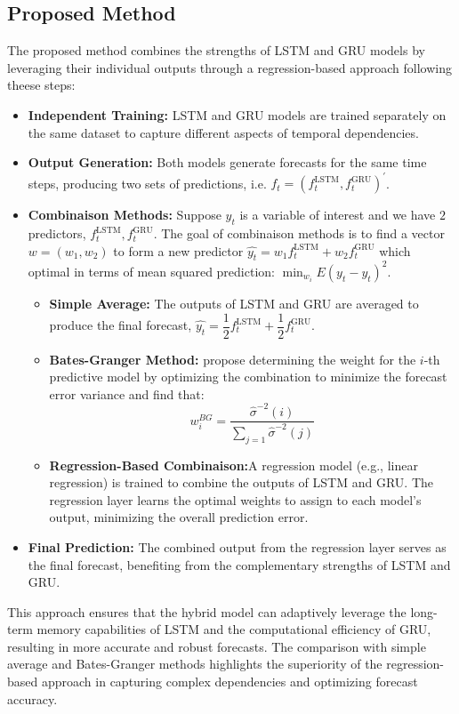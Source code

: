 \documentclass{dsfe}
\begin{document}
\subsection{Proposed Method}
The proposed method combines the strengths of LSTM and GRU models by leveraging their individual outputs through a regression-based approach following theese steps:
\begin{itemize}
\item[]\textbf{Independent Training:} LSTM and GRU models are trained separately on the same dataset to capture different aspects of temporal dependencies.
\item[]\textbf{Output Generation:} Both models generate forecasts for the same time steps, producing two sets of predictions, i.e. $f_t=(f_t^{\text{LSTM}}, f_t^{\text{GRU}})^{'}$.
\item[]\textbf{Combinaison Methods:} Suppose $y_t$ is a variable of interest and we have $2$ predictors, $f_t^{\text{LSTM}}, f_t^{\text{GRU}}$. The goal of combinaison methods is to find a vector $w=(w_1,w_2)$ to form a new predictor $\widehat{y_t}=w_1 f_t^{\text{LSTM}} + w_2 f_t^{\text{GRU}}$ which optimal in terms of mean squared prediction: $\min_{w_i}E(y_t-\widehat{y_t})^2$.
\begin{itemize}
 \item \textbf{Simple Average:} The outputs of LSTM and GRU are averaged to produce the final forecast, $\widehat{y_t}=\dfrac{1}{2} f_t^{\text{LSTM}} + \dfrac{1}{2} f_t^{\text{GRU}}$.
\item \textbf{Bates-Granger Method:} \citep{bates1969} propose determining the weight for the $i$-th predictive model by optimizing the combination to minimize the forecast error variance and find that: 
$$
w_i^{BG}=\dfrac{\widehat{\sigma}^{-2}(i)}{\displaystyle{\sum_{j=1}}\widehat{\sigma}^{-2}(j)}
$$
\item \textbf{Regression-Based Combinaison:}A regression model (e.g., linear regression) is trained to combine the outputs of LSTM and GRU. The regression layer learns the optimal weights to assign to each model's output, minimizing the overall prediction error.
\end{itemize}
\item[]\textbf{Final Prediction:} The combined output from the regression layer serves as the final forecast, benefiting from the complementary strengths of LSTM and GRU.
\end{itemize}
This approach ensures that the hybrid model can adaptively leverage the long-term memory capabilities of LSTM and the computational efficiency of GRU, resulting in more accurate and robust forecasts. The comparison with simple average and Bates-Granger methods highlights the superiority of the regression-based approach in capturing complex dependencies and optimizing forecast accuracy.
\end{document}
